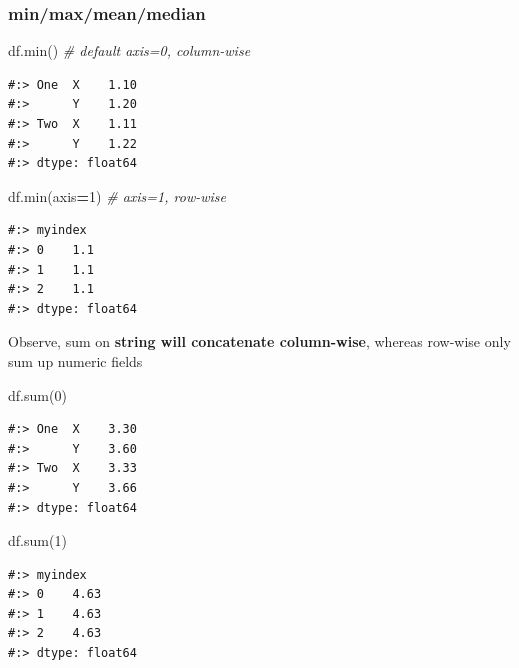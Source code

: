 \documentclass[
]{book}
\newenvironment{Shaded}{\begin{snugshade}}{\end{snugshade}}
\newcommand{\BuiltInTok}[1]{#1}
\newcommand{\CommentTok}[1]{\textcolor[rgb]{0.37,0.37,0.37}{\textit{#1}}}
\newcommand{\DecValTok}[1]{\textcolor[rgb]{0.06,0.06,0.06}{#1}}
\newcommand{\NormalTok}[1]{#1}
\newcommand{\OperatorTok}[1]{\textcolor[rgb]{0.43,0.43,0.43}{\textbf{#1}}}
\begin{document}
\hypertarget{minmaxmeanmedian}{%
\subsubsection{min/max/mean/median}\label{minmaxmeanmedian}}

\begin{Shaded}
\begin{Highlighting}[]
\NormalTok{df.}\BuiltInTok{min}\NormalTok{()  }\CommentTok{# default axis=0, column-wise}
\end{Highlighting}
\end{Shaded}

\begin{verbatim}
#:> One  X    1.10
#:>      Y    1.20
#:> Two  X    1.11
#:>      Y    1.22
#:> dtype: float64
\end{verbatim}

\begin{Shaded}
\begin{Highlighting}[]
\NormalTok{df.}\BuiltInTok{min}\NormalTok{(axis}\OperatorTok{=}\DecValTok{1}\NormalTok{) }\CommentTok{# axis=1, row-wise}
\end{Highlighting}
\end{Shaded}

\begin{verbatim}
#:> myindex
#:> 0    1.1
#:> 1    1.1
#:> 2    1.1
#:> dtype: float64
\end{verbatim}

Observe, sum on \textbf{string will concatenate column-wise}, whereas row-wise only sum up numeric fields

\begin{Shaded}
\begin{Highlighting}[]
\NormalTok{df.}\BuiltInTok{sum}\NormalTok{(}\DecValTok{0}\NormalTok{)}
\end{Highlighting}
\end{Shaded}

\begin{verbatim}
#:> One  X    3.30
#:>      Y    3.60
#:> Two  X    3.33
#:>      Y    3.66
#:> dtype: float64
\end{verbatim}

\begin{Shaded}
\begin{Highlighting}[]
\NormalTok{df.}\BuiltInTok{sum}\NormalTok{(}\DecValTok{1}\NormalTok{)}
\end{Highlighting}
\end{Shaded}

\begin{verbatim}
#:> myindex
#:> 0    4.63
#:> 1    4.63
#:> 2    4.63
#:> dtype: float64
\end{verbatim}
\end{document}

